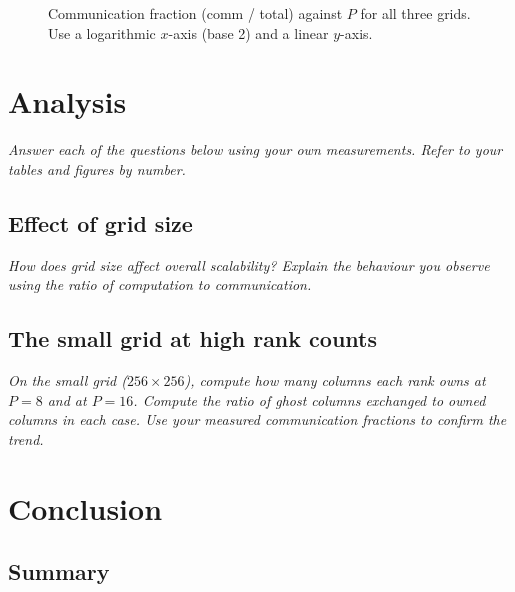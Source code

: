 \documentclass[11pt]{article}
\newcommand{\prompt}[1]{{\itshape\color{gray}#1\par}\medskip}
\begin{document}
\begin{figure}[H]
    \centering
    \caption{Communication fraction (comm / total) against $P$ for all three grids. Use a
    logarithmic $x$-axis (base 2) and a linear $y$-axis.}
    \label{fig:comm}
\end{figure}

\section{Analysis}

\prompt{Answer each of the questions below using your own measurements. Refer to your tables and
figures by number.}

\subsection*{Effect of grid size}

\prompt{How does grid size affect overall scalability? Explain the behaviour you observe using the
ratio of computation to communication.}

\subsection*{The small grid at high rank counts}

\prompt{On the small grid ($256 \times 256$), compute how many columns each rank owns at $P = 8$
and at $P = 16$. Compute the ratio of ghost columns exchanged to owned columns in each case. Use
your measured communication fractions to confirm the trend.}

%

\section{Conclusion}

\subsection*{Summary}
\end{document}
